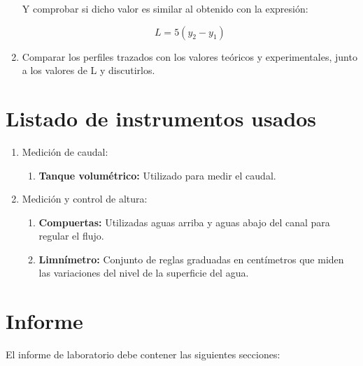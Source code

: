 \documentclass[10pt, a4paper]{exam}
\begin{document}
\begin{enumerate}
    Y comprobar si dicho valor es similar al obtenido con la expresión:

    $$L=5(y_2-y_1)$$

    \item Comparar los perfiles trazados con los valores teóricos y experimentales, junto a los valores de L y discutirlos.
\end{enumerate}


\section{Listado de instrumentos usados}

\begin{enumerate}

    \item Medición de caudal:
    
        \begin{enumerate}
        
            \item \textbf{Tanque volumétrico:} Utilizado para medir el caudal.
            
        \end{enumerate}
        
    \item Medición y control de altura:
    
        \begin{enumerate}
        
            \item \textbf{Compuertas:} Utilizadas aguas arriba y aguas abajo del canal para regular el flujo.
            \item \textbf{Limnímetro:} Conjunto de reglas graduadas en centímetros que miden las variaciones del nivel de la superficie del agua.
            
        \end{enumerate}
        
\end{enumerate}

\section{Informe}

El informe de laboratorio debe contener las siguientes secciones:
\end{document}
